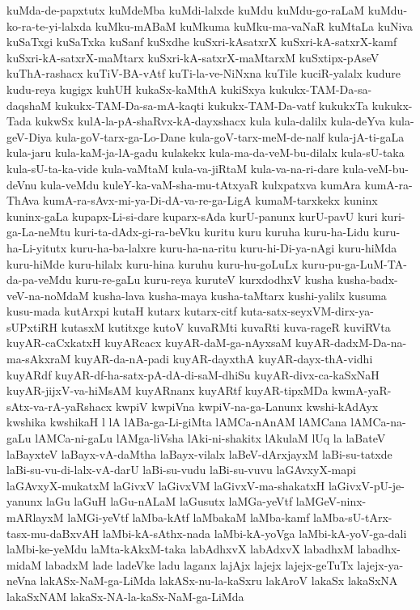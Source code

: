 {kuMda-de-papxtutx
kuMdeMba
kuMdi-lalxde
kuMdu
kuMdu-go-raLaM
kuMdu-ko-ra-te-yi-lalxda
kuMku-mABaM
kuMkuma
kuMku-ma-vaNaR
kuMtaLa
kuNiva
kuSaTxgi
kuSaTxka
kuSanf
kuSxdhe
kuSxri-kAsatxrX
kuSxri-kA-satxrX-kamf
kuSxri-kA-satxrX-maMtarx
kuSxri-kA-satxrX-maMtarxM
kuSxtipx-pAseV
kuThA-rashacx
kuTiV-BA-vAtf
kuTi-la-ve-NiNxna
kuTile
kuciR-yalalx
kudure
kudu-reya
kugigx
kuhUH
kukaSx-kaMthA
kukiSxya
kukukx-TAM-Da-sa-daqshaM
kukukx-TAM-Da-sa-mA-kaqti
kukukx-TAM-Da-vatf
kukukxTa
kukukx-Tada
kukwSx
kulA-la-pA-shaRvx-kA-dayxshacx
kula
kula-dalilx
kula-deYva
kula-geV-Diya
kula-goV-tarx-ga-Lo-Dane
kula-goV-tarx-meM-de-nalf
kula-jA-ti-gaLa
kula-jaru
kula-kaM-ja-lA-gadu
kulakekx
kula-ma-da-veM-bu-dilalx
kula-sU-taka
kula-sU-ta-ka-vide
kula-vaMtaM
kula-va-jiRtaM
kula-va-na-ri-dare
kula-veM-bu-deVnu
kula-veMdu
kuleY-ka-vaM-sha-mu-tAtxyaR
kulxpatxva
kumAra
kumA-ra-ThAva
kumA-ra-sAvx-mi-ya-Di-dA-va-re-ga-LigA
kumaM-tarxkekx
kuninx
kuninx-gaLa
kupapx-Li-si-dare
kuparx-sAda
kurU-panunx
kurU-pavU
kuri
kuri-ga-La-neMtu
kuri-ta-dAdx-gi-ra-beVku
kuritu
kuru
kuruha
kuru-ha-Lidu
kuru-ha-Li-yitutx
kuru-ha-ba-lalxre
kuru-ha-na-ritu
kuru-hi-Di-ya-nAgi
kuru-hiMda
kuru-hiMde
kuru-hilalx
kuru-hina
kuruhu
kuru-hu-goLuLx
kuru-pu-ga-LuM-TA-da-pa-veMdu
kuru-re-gaLu
kuru-reya
kuruteV
kurxdodhxV
kusha
kusha-badx-veV-na-noMdaM
kusha-lava
kusha-maya
kusha-taMtarx
kushi-yalilx
kusuma
kusu-mada
kutArxpi
kutaH
kutarx
kutarx-citf
kuta-satx-seyxVM-dirx-ya-sUPxtiRH
kutasxM
kutitxge
kutoV
kuvaRMti
kuvaRti
kuva-rageR
kuviRVta
kuyAR-caCxkatxH
kuyARcacx
kuyAR-daM-ga-nAyxsaM
kuyAR-dadxM-Da-na-ma-sAkxraM
kuyAR-da-nA-padi
kuyAR-dayxthA
kuyAR-dayx-thA-vidhi
kuyARdf
kuyAR-df-ha-satx-pA-dA-di-saM-dhiSu
kuyAR-divx-ca-kaSxNaH
kuyAR-jijxV-va-hiMsAM
kuyARnanx
kuyARtf
kuyAR-tipxMDa
kwmA-yaR-sAtx-va-rA-yaRshacx
kwpiV
kwpiVna
kwpiV-na-ga-Lanunx
kwshi-kAdAyx
kwshika
kwshikaH
l
lA
lABa-ga-Li-giMta
lAMCa-nAnAM
lAMCana
lAMCa-na-gaLu
lAMCa-ni-gaLu
lAMga-liVsha
lAki-ni-shakitx
lAkulaM
lUq
la
laBateV
laBayxteV
laBayx-vA-daMtha
laBayx-vilalx
laBeV-dArxjayxM
laBi-su-tatxde
laBi-su-vu-di-lalx-vA-darU
laBi-su-vudu
laBi-su-vuvu
laGAvxyX-mapi
laGAvxyX-mukatxM
laGivxV
laGivxVM
laGivxV-ma-shakatxH
laGivxV-pU-je-yanunx
laGu
laGuH
laGu-nALaM
laGusutx
laMGa-yeVtf
laMGeV-ninx-mARlayxM
laMGi-yeVtf
laMba-kAtf
laMbakaM
laMba-kamf
laMba-sU-tArx-tasx-mu-daBxvAH
laMbi-kA-sAthx-nada
laMbi-kA-yoVga
laMbi-kA-yoV-ga-dali
laMbi-ke-yeMdu
laMta-kAkxM-taka
labAdhxvX
labAdxvX
labadhxM
labadhx-midaM
labadxM
lade
ladeVke
ladu
laganx
lajAjx
lajejx
lajejx-geTuTx
lajejx-ya-neVna
lakASx-NaM-ga-LiMda
lakASx-nu-la-kaSxru
lakAroV
lakaSx
lakaSxNA
lakaSxNAM
lakaSx-NA-la-kaSx-NaM-ga-LiMda
}
